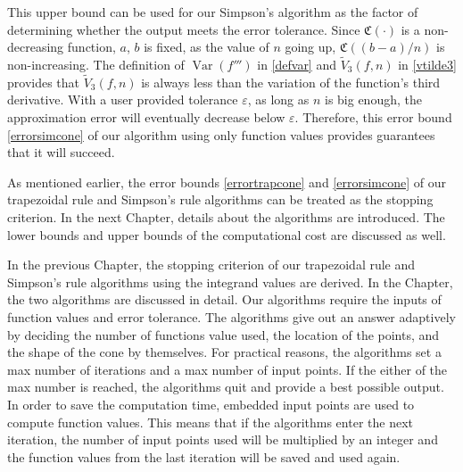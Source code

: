 \documentclass{iitthesis}
\DeclareMathOperator{\Var}{Var}
\theoremstyle{definition}
\theoremstyle{remark}
\begin{document}
This upper bound can be used for our Simpson's algorithm as the factor of determining whether the output meets the error tolerance. Since $\mathfrak{C}(\cdot)$ is a non-decreasing function, $a$, $b$ is fixed, as the value of $n$ going up, $\mathfrak{C}((b-a)/n)$ is non-increasing. The definition of $\Var(f''')$ in \eqref{defvar} and $\widetilde{V}_3(f,n)$ in \eqref{vtilde3} provides that $\widetilde{V}_3(f,n)$ is always less than the variation of the function's third derivative. With a user provided tolerance $\varepsilon$, as long as $n$ is big enough, the approximation error will eventually decrease below $\varepsilon$.  Therefore, this error bound \eqref{errorsimcone} of our algorithm using only function values provides guarantees that it will succeed.

As mentioned earlier, the error bounds \eqref{errortrapcone} and \eqref{errorsimcone} of our trapezoidal rule and Simpson's rule algorithms can be treated as the stopping criterion. In the next Chapter, details about the algorithms are introduced. The lower bounds and upper bounds of the computational cost are discussed as well.

%






In the previous Chapter, the stopping criterion of our trapezoidal rule and Simpson's rule algorithms using the integrand values are derived. In the Chapter, the two algorithms are discussed in detail. Our algorithms require the inputs of function values and error tolerance. The algorithms give out an answer adaptively by deciding the number of functions value used, the location of the points, and the shape of the cone by themselves. For practical reasons, the algorithms set a max number of iterations and a max number of input points. If the either of the max number is reached, the algorithms quit and provide a best possible output. In order to save the computation time, embedded input points are used to compute function values. This means that if the algorithms enter the next iteration, the number of input points used will be multiplied by an integer and the function values from the last iteration will be saved and used again.
\end{document}

